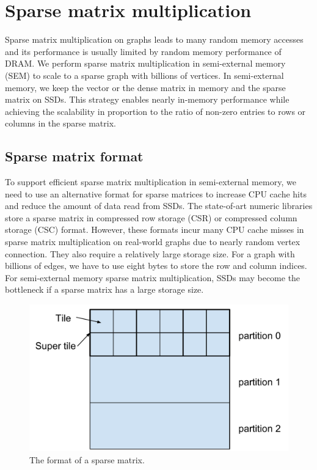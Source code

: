 \section{Sparse matrix multiplication}
Sparse matrix multiplication on graphs leads to many random memory
accesses and its performance is usually limited by random memory performance
of DRAM. We perform sparse matrix multiplication in semi-external memory (SEM)
to scale to a sparse graph with billions of vertices. In semi-external memory,
we keep the vector or the dense matrix in memory and the sparse matrix on SSDs.
This strategy enables nearly in-memory performance while achieving
the scalability in proportion to the ratio of non-zero entries to rows or columns
in the sparse matrix.

\subsection{Sparse matrix format}
To support efficient sparse matrix multiplication in semi-external memory,
we need to use an alternative format for sparse matrices to increase CPU cache
hits and reduce the amount of data read from SSDs.
The state-of-art numeric libraries store a sparse matrix in compressed row storage
(CSR) or compressed column storage (CSC) format. However, these formats incur
many CPU cache misses in sparse matrix multiplication on real-world graphs
due to nearly random vertex connection. They also require a relatively
large storage size. For a graph with billions of edges, we have to use eight
bytes to store the row and column indices. For semi-external memory sparse
matrix multiplication, SSDs may become the bottleneck if a sparse matrix has
a large storage size.

\begin{figure}
\centering
\includegraphics[scale=0.3]{./sparse_mat.pdf}
\caption{The format of a sparse matrix.}
\label{sparse_mat}
\end{figure}

